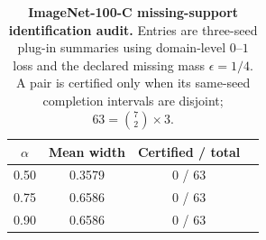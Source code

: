 \begin{table}[t]
\centering
\small
\caption{\textbf{ImageNet-100-C missing-support identification audit.} Entries are three-seed plug-in summaries using domain-level $0$--$1$ loss and the declared missing mass $\epsilon=1/4$. A pair is certified only when its same-seed completion intervals are disjoint; $63=\binom{7}{2}\times3$.}
\label{tab:imagenet100c-identification-audit}
\begin{tabular}{@{}cccc@{}}
\toprule
$\alpha$ & Mean width & Certified / total \\
\midrule
0.50 & 0.3579 & 0 / 63 \\
0.75 & 0.6586 & 0 / 63 \\
0.90 & 0.6586 & 0 / 63 \\
\bottomrule
\end{tabular}
\end{table}
